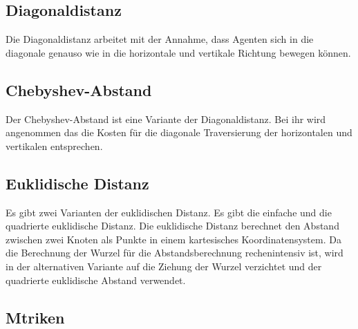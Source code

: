 \subsection{Diagonaldistanz}
Die Diagonaldistanz arbeitet mit der Annahme, dass Agenten sich in die diagonale genauso wie in die horizontale und vertikale Richtung bewegen können. 
\subsection{Chebyshev-Abstand}
Der Chebyshev-Abstand ist eine Variante der Diagonaldistanz. Bei ihr wird angenommen das die Kosten für die diagonale Traversierung der horizontalen und vertikalen entsprechen. 
\subsection{Euklidische Distanz}
Es gibt zwei Varianten der euklidischen Distanz. Es gibt die einfache und die quadrierte euklidische Distanz. Die euklidische Distanz berechnet den Abstand zwischen zwei Knoten als Punkte in einem kartesisches Koordinatensystem. Da die Berechnung der Wurzel für die Abstandsberechnung rechenintensiv ist, wird in der alternativen Variante auf die Ziehung der Wurzel verzichtet und der quadrierte euklidische Abstand verwendet\cite{YouSurLuhu}.


\subsection{Mtriken}

